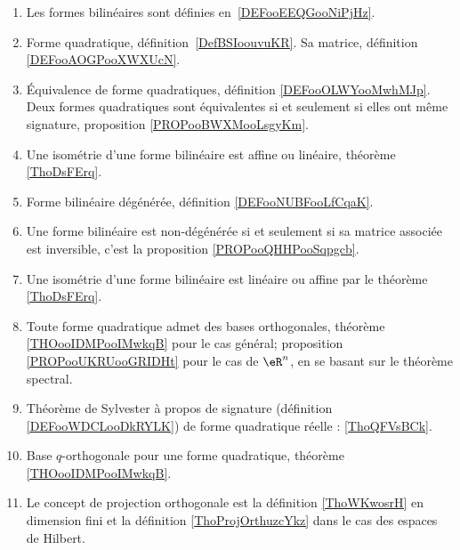       \label{THEMEooOAJKooEvcCVn}
    \begin{enumerate}
\item
    Les formes bilinéaires sont définies en~\ref{DEFooEEQGooNiPjHz}.
\item
    Forme quadratique, définition~\ref{DefBSIoouvuKR}. Sa matrice, définition \ref{DEFooAOGPooXWXUcN}.
\item
    Équivalence de forme quadratiques, définition \ref{DEFooOLWYooMwhMJp}. Deux formes quadratiques sont équivalentes si et seulement si elles ont même signature, proposition \ref{PROPooBWXMooLsgyKm}.
\item
    Une isométrie d'une forme bilinéaire est affine ou linéaire, théorème \ref{ThoDsFErq}.
\item
    Forme bilinéaire dégénérée, définition \ref{DEFooNUBFooLfCqaK}.
\item
    Une forme bilinéaire est non-dégénérée si et seulement si sa matrice associée est inversible, c'est la proposition \ref{PROPooQHHPooSqpgcb}.
\item
    Une isométrie d'une forme bilinéaire est linéaire ou affine par le théorème \ref{ThoDsFErq}.
\item
    Toute forme quadratique admet des bases orthogonales, théorème \ref{THOooIDMPooIMwkqB} pour le cas général; proposition \ref{PROPooUKRUooGRIDHt} pour le cas de \( \eR^n\), en se basant sur le théorème spectral.
\item
    Théorème de Sylvester à propos de signature (définition \ref{DEFooWDCLooDkRYLK}) de forme quadratique réelle : \ref{ThoQFVsBCk}.
\item
    Base \( q\)-orthogonale pour une forme quadratique, théorème \ref{THOooIDMPooIMwkqB}.
    \item
        Le concept de projection orthogonale est la définition \ref{ThoWKwosrH} en dimension fini et la définition \ref{ThoProjOrthuzcYkz} dans le cas des espaces de Hilbert.
\end{enumerate}

